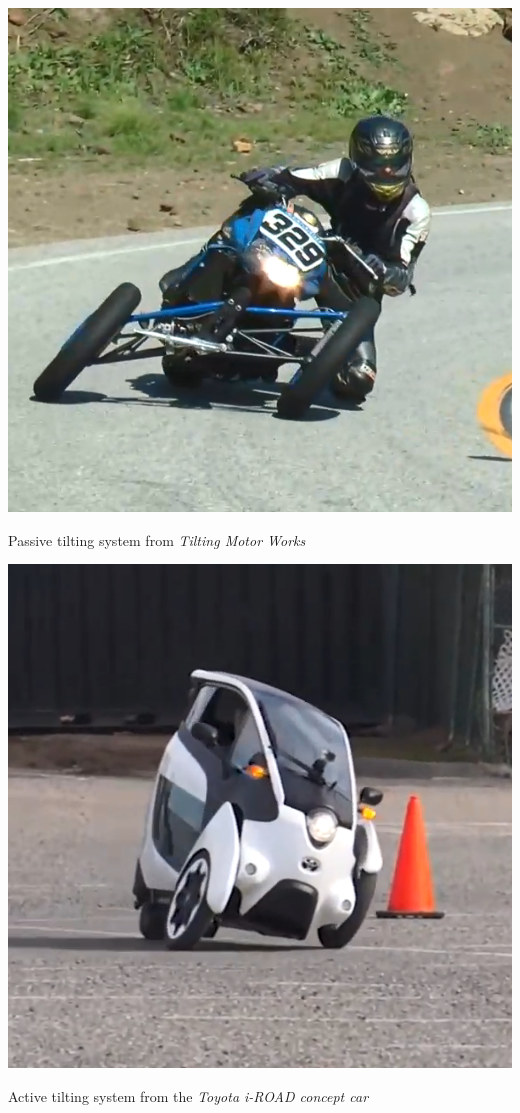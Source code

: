 \begin{marginfigure}
	\includegraphics[width=1.0\linewidth]{figs/02/passive}
	\caption{Passive tilting system from \textit{Tilting Motor Works}}
\end{marginfigure}
\begin{marginfigure}
	\includegraphics[width=1.0\linewidth]{figs/02/active}
	\caption{Active tilting system from the \textit{Toyota i-ROAD concept car}}
\end{marginfigure}

